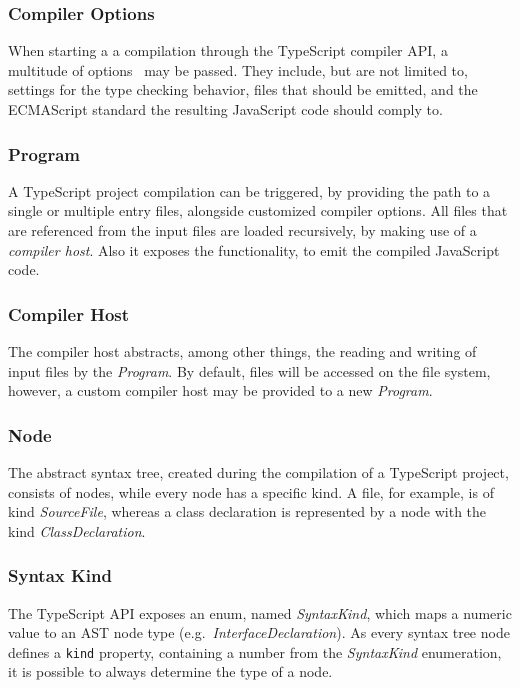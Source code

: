 \subsubsection{Compiler Options}

When starting a a compilation through the TypeScript compiler API, a multitude of options~\cite{TypeScriptHandbook:CompilerOptions} may be passed. They include, but are not limited to, settings for the type checking behavior, files that should be emitted, and the ECMAScript standard the resulting JavaScript code should comply to.

\subsubsection{Program}

A TypeScript project compilation can be triggered, by providing the path to a single or multiple entry files, alongside customized compiler options. All files that are referenced from the input files are loaded recursively, by making use of a \emph{compiler host}. Also it exposes the functionality, to emit the compiled JavaScript code.

\subsubsection{Compiler Host}

The compiler host abstracts, among other things, the reading and writing of input files by the \emph{Program}. By default, files will be accessed on the file system, however, a custom compiler host may be provided to a new \emph{Program}.

\subsubsection{Node}

The abstract syntax tree, created during the compilation of a TypeScript project, consists of nodes, while every node has a specific kind. A file, for example, is of kind \emph{SourceFile}, whereas a class declaration is represented by a node with the kind \emph{ClassDeclaration}.

\subsubsection{Syntax Kind}

The TypeScript API exposes an enum, named \emph{SyntaxKind}, which maps a numeric value to an AST node type (e.g.\ \emph{InterfaceDeclaration}). As every syntax tree node defines a \texttt{kind} property, containing a number from the \emph{SyntaxKind} enumeration, it is possible to always determine the type of a node.

